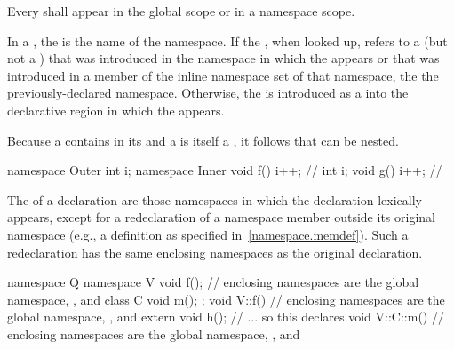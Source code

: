 \pnum
Every  shall appear in the global scope
or in a namespace scope.

\pnum
In a ,
the  is the name of the namespace.
If the , when looked up,
refers to a  (but not a )
that was introduced in the namespace
in which the  appears
or that was introduced in a member of the inline namespace set of that namespace,
the 
 the previously-declared namespace.
Otherwise, the  is introduced
as a  into the declarative region
in which the  appears.

\pnum
Because a  contains
 in its  and a
 is itself a , it
follows that  can be nested.
\begin{example}
\begin{codeblock}
namespace Outer {
  int i;
  namespace Inner {
    void f() { i++; }           // 
    int i;
    void g() { i++; }           // 
  }
}
\end{codeblock}
\end{example}

\pnum
The  of a declaration are those
namespaces in which the declaration lexically appears, except for a
redeclaration of a namespace member outside its original namespace
(e.g., a definition as specified in~\ref{namespace.memdef}). Such a
redeclaration has the same enclosing namespaces as the original
declaration.
\begin{example}
\begin{codeblock}
namespace Q {
  namespace V {
    void f();                   // enclosing namespaces are the global namespace, , and 
    class C { void m(); };
  }
  void V::f() {                 // enclosing namespaces are the global namespace, , and 
    extern void h();            // ... so this declares 
  }
  void V::C::m() {              // enclosing namespaces are the global namespace, , and 
  }
}
\end{codeblock}
\end{example}

